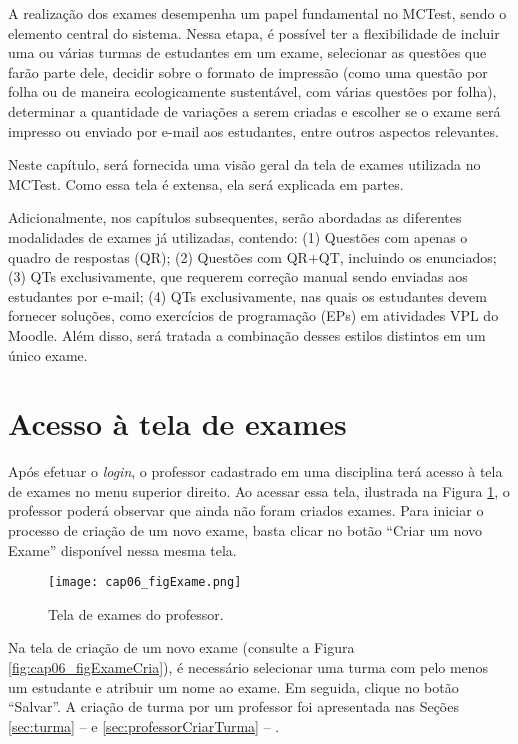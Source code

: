 \label{ch:exames}

A realização dos exames desempenha um papel fundamental no MCTest, sendo o elemento central do sistema. Nessa etapa, é possível ter a flexibilidade de incluir uma ou várias turmas de estudantes em um exame, selecionar as questões que farão parte dele, decidir sobre o formato de impressão (como uma questão por folha ou de maneira ecologicamente sustentável, com várias questões por folha), determinar a quantidade de variações a serem criadas e escolher se o exame será impresso ou enviado por e-mail aos estudantes, entre outros aspectos relevantes.

Neste capítulo, será fornecida uma visão geral da tela de exames utilizada no MCTest. Como essa tela é extensa, ela será explicada em partes.

Adicionalmente, nos capítulos subsequentes, serão abordadas as diferentes modalidades de exames já utilizadas, contendo:
(1) Questões com apenas o quadro de respostas (QR);
(2) Questões com QR+QT, incluindo os enunciados;
(3) QTs exclusivamente, que requerem correção manual sendo enviadas aos estudantes por e-mail;
(4) QTs exclusivamente, nas quais os estudantes devem fornecer soluções, como exercícios de programação (EPs) em atividades VPL do Moodle.
Além disso, será tratada a combinação desses estilos distintos em um único exame.

\section{Acesso à tela de exames}\label{sec:telaExame}

Após efetuar o \textit{login}, o professor cadastrado em uma disciplina terá acesso à tela de exames no menu superior direito. Ao acessar essa tela, ilustrada na Figura \ref{fig:cap06_figExame}, o professor poderá observar que ainda não foram criados exames. Para iniciar o processo de criação de um novo exame, basta clicar no botão ``Criar um novo Exame'' disponível nessa mesma tela.

\begin{figure}[htbp]
  \centering
  \texttt{[image: cap06\_figExame.png]}
  \caption{Tela de exames do professor.}
  \label{fig:cap06_figExame}
\end{figure}

Na tela de criação de um novo exame (consulte a Figura \ref{fig:cap06_figExameCria}), é necessário selecionar uma turma com pelo menos um estudante e atribuir um nome ao exame. Em seguida, clique no botão ``Salvar''. A criação de turma por um professor foi apresentada nas Seções \ref{sec:turma} --  e \ref{sec:professorCriarTurma} -- .

